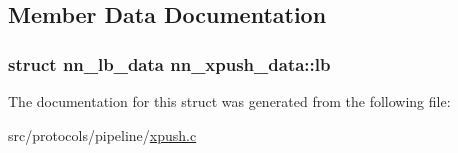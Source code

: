 \subsection{Member Data Documentation}
\subsubsection[{lb}]{\setlength{\rightskip}{0pt plus 5cm}struct {\bf nn\+\_\+lb\+\_\+data} nn\+\_\+xpush\+\_\+data\+::lb}\hypertarget{structnn__xpush__data_ac8eb3f7d4f57f2d9e6af5ce2f9f3f5b8}{}\label{structnn__xpush__data_ac8eb3f7d4f57f2d9e6af5ce2f9f3f5b8}


The documentation for this struct was generated from the following file\+:\begin{DoxyCompactItemize}
\item 
src/protocols/pipeline/\hyperlink{xpush_8c}{xpush.\+c}\end{DoxyCompactItemize}
